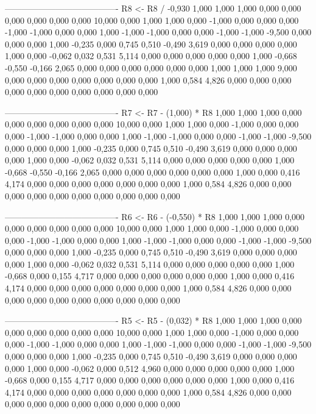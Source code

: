 \documentclass[12pt]{article}
\begin{document}
\begin{enumerate}
\begin{keluaran}
----------------------------------------
R8 <- R8 / -0,930
1,000   1,000   1,000   0,000   0,000   0,000   0,000   0,000   0,000   10,000
0,000   1,000   1,000   0,000   -1,000  0,000   0,000   0,000   -1,000  -1,000
0,000   0,000   1,000   -1,000  -1,000  0,000   0,000   -1,000  -1,000  -9,500
0,000   0,000   0,000   1,000   -0,235  0,000   0,745   0,510   -0,490  3,619
0,000   0,000   0,000   0,000   1,000   0,000   -0,062  0,032   0,531   5,114
0,000   0,000   0,000   0,000   0,000   1,000   -0,668  -0,550  -0,166  2,065
0,000   0,000   0,000   0,000   0,000   0,000   1,000   1,000   1,000   9,000
0,000   0,000   0,000   0,000   0,000   0,000   0,000   1,000   0,584   4,826
0,000   0,000   0,000   0,000   0,000   0,000   0,000   0,000   0,000   0,000

----------------------------------------
R7 <- R7 - (1,000) * R8
1,000   1,000   1,000   0,000   0,000   0,000   0,000   0,000   0,000   10,000
0,000   1,000   1,000   0,000   -1,000  0,000   0,000   0,000   -1,000  -1,000
0,000   0,000   1,000   -1,000  -1,000  0,000   0,000   -1,000  -1,000  -9,500
0,000   0,000   0,000   1,000   -0,235  0,000   0,745   0,510   -0,490  3,619
0,000   0,000   0,000   0,000   1,000   0,000   -0,062  0,032   0,531   5,114
0,000   0,000   0,000   0,000   0,000   1,000   -0,668  -0,550  -0,166  2,065
0,000   0,000   0,000   0,000   0,000   0,000   1,000   0,000   0,416   4,174
0,000   0,000   0,000   0,000   0,000   0,000   0,000   1,000   0,584   4,826
0,000   0,000   0,000   0,000   0,000   0,000   0,000   0,000   0,000   0,000

----------------------------------------
R6 <- R6 - (-0,550) * R8
1,000   1,000   1,000   0,000   0,000   0,000   0,000   0,000   0,000   10,000
0,000   1,000   1,000   0,000   -1,000  0,000   0,000   0,000   -1,000  -1,000
0,000   0,000   1,000   -1,000  -1,000  0,000   0,000   -1,000  -1,000  -9,500
0,000   0,000   0,000   1,000   -0,235  0,000   0,745   0,510   -0,490  3,619
0,000   0,000   0,000   0,000   1,000   0,000   -0,062  0,032   0,531   5,114
0,000   0,000   0,000   0,000   0,000   1,000   -0,668  0,000   0,155   4,717
0,000   0,000   0,000   0,000   0,000   0,000   1,000   0,000   0,416   4,174
0,000   0,000   0,000   0,000   0,000   0,000   0,000   1,000   0,584   4,826
0,000   0,000   0,000   0,000   0,000   0,000   0,000   0,000   0,000   0,000

----------------------------------------
R5 <- R5 - (0,032) * R8
1,000   1,000   1,000   0,000   0,000   0,000   0,000   0,000   0,000   10,000
0,000   1,000   1,000   0,000   -1,000  0,000   0,000   0,000   -1,000  -1,000
0,000   0,000   1,000   -1,000  -1,000  0,000   0,000   -1,000  -1,000  -9,500
0,000   0,000   0,000   1,000   -0,235  0,000   0,745   0,510   -0,490  3,619
0,000   0,000   0,000   0,000   1,000   0,000   -0,062  0,000   0,512   4,960
0,000   0,000   0,000   0,000   0,000   1,000   -0,668  0,000   0,155   4,717
0,000   0,000   0,000   0,000   0,000   0,000   1,000   0,000   0,416   4,174
0,000   0,000   0,000   0,000   0,000   0,000   0,000   1,000   0,584   4,826
0,000   0,000   0,000   0,000   0,000   0,000   0,000   0,000   0,000   0,000


\end{keluaran}
\end{enumerate}
\end{document}
